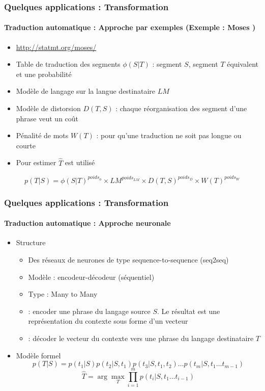 \documentclass[xcolor=table]{beamer}
\begin{document}
\begin{frame}
	\frametitle{Quelques applications : Transformation}
	\framesubtitle{Traduction automatique : Approche par exemples (Exemple : Moses \cite{07-koehn-al})}
	\begin{itemize}
		\item \url{http://statmt.org/moses/}
		\item Table de traduction des segments $\phi(S|T)$ : segment $S$, segment $T$ équivalent et une probabilité
		\item Modèle de langage sur la langue destinataire $LM$
		\item Modèle de distorsion $ D(T, S) $ : chaque réorganisation des segment d'une phrase veut un coût 
		\item Pénalité de mots $W(T)$ : pour qu'une traduction ne soit pas longue ou courte
		\item Pour estimer $\hat{T}$  est utilisé
	\end{itemize}

	\[p(T|S) = \phi(S|T)^{poids_{\phi}} \times LM^{poids_{LM}} \times D(T, S)^{poids_{D}} \times W(T)^{poids_{W}}\]
\end{frame}

\begin{frame}
	\frametitle{Quelques applications : Transformation}
	\framesubtitle{Traduction automatique : Approche neuronale}
	\begin{itemize}
		\item Structure
		\begin{itemize}
			\item Des réseaux de neurones de type sequence-to-sequence (seq2seq)
			\item Modèle : encodeur-décodeur (séquentiel)
			\item Type : Many to Many 
			\item {} : encoder une phrase du langage source $S$. Le résultat est une représentation du contexte sous forme d'un vecteur
			\item {} : décoder le vecteur du contexte vers une phrase du langage destinataire $T$
		\end{itemize}
	
		\item Modèle formel 
		\[ p(T|S) = p(t_1|S) p(t_2|S, t_1) p(t_3|S, t_1, t_2)\ldots p(t_m|S, t_1\ldots t_{m-1}) \]
		\[\hat{T} = \arg\max_{T} \prod_{i=1}^{m} p(t_i | S, t_1\ldots t_{i-1})\]
	\end{itemize}
\end{frame}
\end{document}
